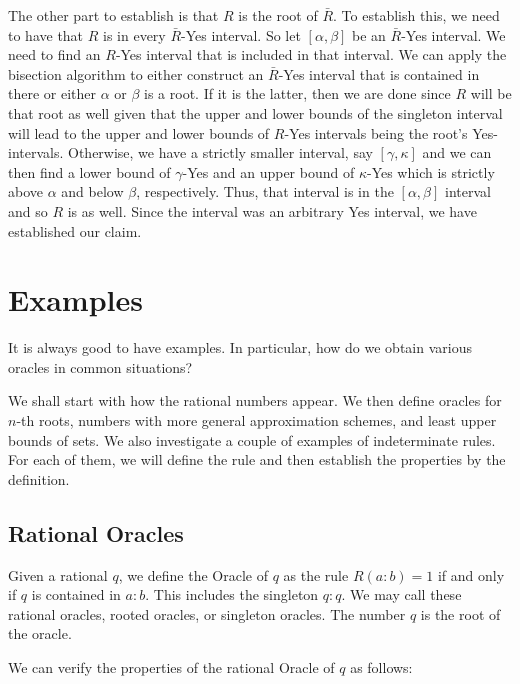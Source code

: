 \documentclass[12pt]{article}
\begin{document}
The other part to establish is that $R$ is the root of $\bar{R}$. To establish this, we need to have that $R$ is in every $\bar{R}$-Yes interval. So let $[\alpha, \beta]$ be an $\bar{R}$-Yes interval. We need to find an $R$-Yes interval that is included in that interval. We can apply the bisection algorithm to either construct an $\bar{R}$-Yes interval that is contained in there or either $\alpha$ or $\beta$ is a root. If it is the latter, then we are done since $R$ will be that root as well given that the upper and lower bounds of the singleton interval will lead to the upper and lower bounds of $R$-Yes intervals being the root's Yes-intervals. Otherwise, we have a strictly smaller interval, say $[\gamma, \kappa]$ and we can then find a lower bound of $\gamma$-Yes and an upper bound of $\kappa$-Yes which is strictly above $\alpha$ and below $\beta$, respectively. Thus, that interval is in the $[\alpha, \beta]$ interval and so $R$ is as well. Since the interval was an arbitrary Yes interval, we have established our claim. 


\section{Examples}

It is always good to have examples. In particular, how do we obtain various oracles in common situations? 

We shall start with how the rational numbers appear. We then define oracles for $n$-th roots,  numbers with more general approximation schemes, and least upper bounds of sets. We also investigate a couple of examples of indeterminate rules. For each of them, we will define the rule and then establish the properties by the definition. 

\subsection{Rational Oracles}\label{sec:rat-ora}

Given a rational $q$, we define the Oracle of $q$ as the rule $R(a:b) = 1$ if and only if $q$ is contained in $a:b$. This includes the singleton $q:q$.  We may call these rational oracles, rooted oracles, or singleton oracles. The number $q$ is the root of the oracle. 

We can verify the properties of the rational Oracle of $q$ as follows: 
\end{document}
